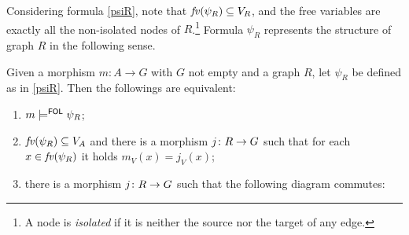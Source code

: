 Considering formula \eqref{psiR}, note that $\mathit{fv}(\psi_R) \subseteq V_R$, and the free variables are exactly all the non-isolated nodes of $R$.\footnote{A node is \emph{isolated} if it is neither the source nor the target of any edge.} Formula $\psi_R$ represents the structure of graph $R$ in the following sense.
\begin{lemma}
  \label{lem:psi-R}
Given a morphism $m: A \to G$ with $G$ not empty and a graph $R$, let $\psi_R$ be defined as in \eqref{psiR}. Then the followings are equivalent:
\begin{enumerate} 
  \item $m \models^{\mathsf{FOL}} \psi_R$;
  \item $\mathit{fv}(\psi_R) \subseteq V_A$ and there is a morphism $j \colon R \rightarrow G$ such that for each $x \in \mathit{fv}(\psi_R)$ it holds $m_V(x) = j_V(x)$;
  \item there is a morphism $j \colon R \rightarrow G$ such that the following diagram commutes:
\begin{center}
\end{center} 
\end{enumerate}
\end{lemma}

